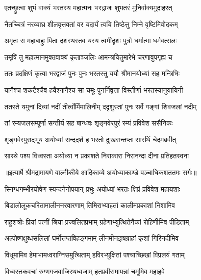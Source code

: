 \twolineshloka
{एतच्छ्रुत्वा शुभं वाक्यं भरतस्य महात्मनः}
{भरद्वाजः शुभतरं मुनिर्वाक्यमुदाहरत्} %

\twolineshloka
{नैतच्चित्रं नरव्याघ्र शीलवृत्तवतां वर}
{यदार्यं त्वयि तिष्ठेत्तु निम्ने वृष्टिमिवोदकम्} %

\twolineshloka
{अमृतः स महाबाहुः पिता दशरथस्तव}
{यस्य त्वमीदृशः पुत्रो धर्मात्मा धर्मवत्सलः} %

\twolineshloka
{तमृषिं तु महात्मानमुक्तवाक्यं कृताञ्जलिः}
{आमन्त्रयितुमारेभे चरणावुपगृह्य च} %

\twolineshloka
{ततः प्रदक्षिणं कृत्वा भरद्वाजं पुनः पुनः}
{भरतस्तु ययौ श्रीमानयोध्यां सह मन्त्रिभिः} %

\twolineshloka
{यानैश्च शकटैश्चैव हयैश्नागैश्च सा चमूः}
{पुनर्निवृत्ता विस्तीर्णा भरतस्यानुयायिनी} %

\twolineshloka
{ततस्ते यमुनां दिव्यां नदीं तीर्त्वोर्मिमालिनीम्}
{ददृशुस्तां पुनः सर्वे गङ्गां शिवजलां नदीम्} %

\twolineshloka
{तां रम्यजलसम्पूर्णां सन्तीर्य सह बान्धवः}
{शृङ्गवेरपुरं रम्यं प्रविवेश ससैनिकः} %

\twolineshloka
{शृङ्गवेरपुराद्भूय अयोध्यां सन्ददर्श ह}
{भरतो दुःखसन्तप्तः सारथिं चेदमब्रवीत्} %

\twolineshloka
{सारथे पश्य विध्वस्ता अयोध्या न प्रकाशते}
{निराकारा निरानन्दा दीना प्रतिहतस्वना} %


{॥इत्यार्षे श्रीमद्रामायणे वाल्मीकीये आदिकाव्ये अयोध्याकाण्डे पञ्चाधिकशततमः सर्गः॥}


\twolineshloka
{स्निग्धगम्भीरघोषेण स्यन्दनेनोपयान् प्रभुः}
{अयोध्यां भरतः क्षिप्रं प्रविवेश महायशाः} %

\twolineshloka
{बिडालोलूकचरितामालीननरवारणाम्}
{तिमिराभ्याहतां कालीमप्रकाशां निशामिव} %

\twolineshloka
{राहुशत्रोः प्रियां पत्नीं श्रिया प्रज्वलितप्रभाम्}
{ग्रहेणाभ्युत्थितेनैकां रोहिणीमिव पीडिताम्} %

\twolineshloka
{अल्पोष्णक्षुब्धसलिलां घर्मोत्तप्तविहङ्गमाम्}
{लीनमीनझषग्राहां कृशां गिरिनदीमिव} %

\twolineshloka
{विधूमामिव हेमाभामध्वराग्निसमुत्थिताम्}
{हविरभ्युक्षितां पश्चाच्छिखां विप्रलयं गताम्} %

\twolineshloka
{विध्वस्तकवचां रुग्णगजवाजिरथध्वजाम्}
{हतप्रवीरामापन्नां चमूमिव महाहवे} %


